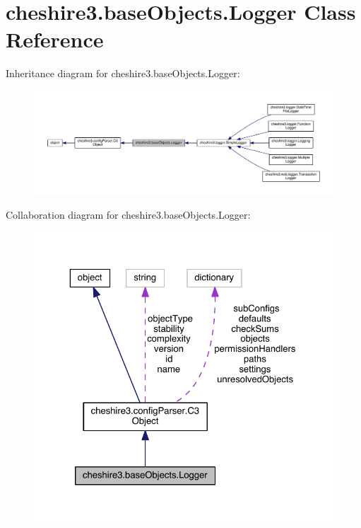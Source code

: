 \hypertarget{classcheshire3_1_1base_objects_1_1_logger}{\section{cheshire3.\-base\-Objects.\-Logger Class Reference}
\label{classcheshire3_1_1base_objects_1_1_logger}
}


Inheritance diagram for cheshire3.\-base\-Objects.\-Logger\-:
\nopagebreak
\begin{figure}[H]
\begin{center}
\leavevmode
\includegraphics[width=350pt]{classcheshire3_1_1base_objects_1_1_logger__inherit__graph}
\end{center}
\end{figure}


Collaboration diagram for cheshire3.\-base\-Objects.\-Logger\-:
\nopagebreak
\begin{figure}[H]
\begin{center}
\leavevmode
\includegraphics[width=325pt]{classcheshire3_1_1base_objects_1_1_logger__coll__graph}
\end{center}
\end{figure}
